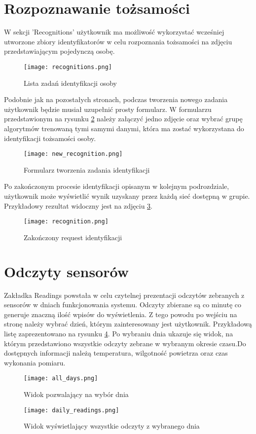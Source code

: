 \section{Rozpoznawanie tożsamości}
W sekcji 'Recognitions' użytkownik ma możliwość wykorzystać wcześniej utworzone zbiory identyfikatorów w celu rozpoznania tożsamości na zdjęciu przedstawiającym pojedynczą osobę.
\begin{figure}[H]
	\centering
	\texttt{[image: recognitions.png]}
	\caption{Lista zadań identyfikacji osoby}
	\label{fig:recognitions}
\end{figure}
Podobnie jak na pozostałych stronach, podczas tworzenia nowego zadania użytkownik będzie musiał uzupełnić prosty formularz. W formularzu przedstawionym na rysunku \ref{fig:new_recognition} należy załączyć jedno zdjęcie oraz wybrać grupę algorytmów trenowaną tymi samymi danymi, która ma zostać wykorzystana do identyfikacji tożsamości osoby.
\begin{figure}[H]
	\centering
	\texttt{[image: new\_recognition.png]}
	\caption{Formularz tworzenia zadania identyfikacji}
	\label{fig:new_recognition}
\end{figure}
Po zakończonym procesie identyfikacji opisanym w kolejnym podrozdziale, użytkownik może wyświetlić wynik uzyskany przez każdą sieć dostępną w grupie. Przykładowy rezultat widoczny jest na zdjęciu \ref{fig:recognition}.
\begin{figure}[H]
	\centering
	\texttt{[image: recognition.png]}
	\caption{Zakończony request identyfikacji}
	\label{fig:recognition}
\end{figure}

\section{Odczyty sensorów}
Zakładka Readings powstała w celu czytelnej prezentacji odczytów zebranych z sensorów w dniach funkcjonowania systemu. Odczyty zbierane są co minutę co generuje znaczną ilość wpisów do wyświetlenia. Z tego powodu po wejściu na stronę należy wybrać dzień, którym zainteresowany jest użytkownik. Przykładową listę zaprezentowano na rysunku \ref{fig:all_days}. Po wybraniu dnia ukazuje się widok, na którym przedstawiono wszystkie odczyty zebrane w wybranym okresie czasu.Do dostępnych informacji należą temperatura, wilgotność powietrza oraz czas wykonania pomiaru.
\begin{figure}[H]
	\centering
	\texttt{[image: all\_days.png]}
	\caption{Widok pozwalający na wybór dnia}
	\label{fig:all_days}
\end{figure}
\begin{figure}[H]
	\centering
	\texttt{[image: daily\_readings.png]}
	\caption{Widok wyświetlający wszystkie odczyty z wybranego dnia}
	\label{fig:daily_readings}
\end{figure}


